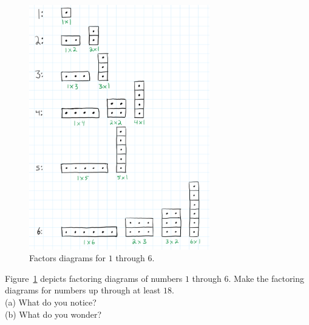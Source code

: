 \begin{figure}[h!]
    \centering
    \includegraphics[width=0.7\textwidth]{img/number_factors.png}  
    \caption{Factors diagrams for \(1\) through \(6\).}
    \label{fig:number-factors}
\end{figure}
\begin{exercise}
	Figure~\ref{fig:number-factors} depicts factoring diagrams of numbers \(1\) through \(6\).  
	Make the factoring diagrams for numbers up through at least \(18\).  
	\\ \hspace*{15mm}(a) What do you notice?
	\\ \hspace*{15mm}(b) What do you wonder? 
\end{exercise}



